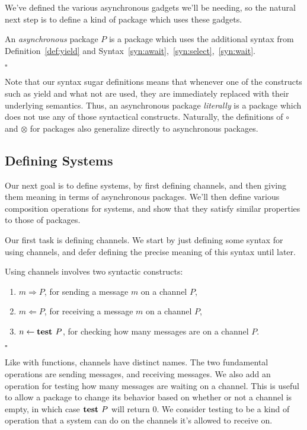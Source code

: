 We've defined the various asynchronous gadgets we'll be needing,
so the natural next step is to define a kind of package which
uses these gadgets.

\begin{definition}
  An \emph{asynchronous} package $P$ is a package which uses the additional
  syntax from Definition~\ref{def:yield} and Syntax~\ref{syn:await},~\ref{syn:select},~\ref{syn:wait}.

  $\square$
\end{definition}

Note that our syntax sugar definitions means that whenever one of the constructs
such as yield and what not are used, they are immediately replaced with their underlying
semantics. Thus, an asynchronous package \emph{literally} is a package which 
does not use any of those syntactical constructs.
Naturally, the definitions of $\circ$ and $\otimes$ for packages also
generalize directly to asynchronous packages.

\subsection{Defining Systems}

Our next goal is to define systems, by first defining channels,
and then giving them meaning in terms of asynchronous packages.
We'll then define various composition operations for systems,
and show that they satisfy similar properties to those of packages.

Our first task is defining channels.
We start by just defining some syntax for using channels,
and defer defining the precise meaning of this syntax until later. 

\begin{syntax}[Channels]
  Using channels involves two syntactic constructs:
  \begin{enumerate}
    \item $m \Rightarrow P$, for sending a message $m$ on a channel $P$,
    \item $m \Leftarrow P$, for receiving a message $m$ on a channel $P$,
    \item $n \gets \textbf{test } P$, for checking how many messages are on a channel $P$.
  \end{enumerate}

  $\square$
\end{syntax}

Like with functions, channels have distinct names.
The two fundamental operations are sending messages, and receiving messages.
We also add an operation for testing how many messages are waiting on a channel.
This is useful to allow a package to change its behavior based on whether
or not a channel is empty, in which case $\textbf{test } P$ will return $0$.
We consider testing to be a kind of operation that a system
can do on the channels it's allowed to receive on.

